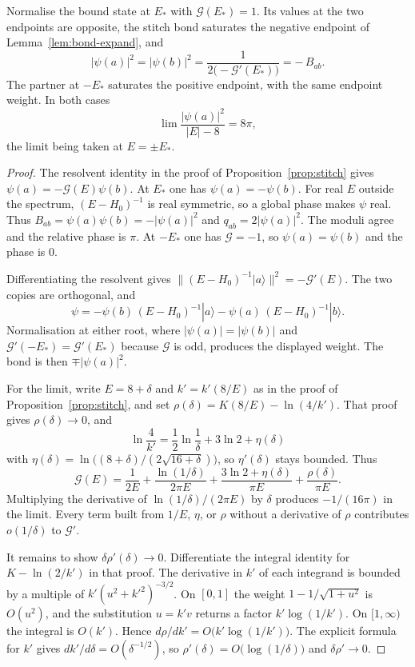 \begin{proposition}
\label{prop:endpoint}
Normalise the bound state at \(E_*\) with \(\mathcal{G}(E_*)=1\).
Its values at the two endpoints are opposite, the stitch bond saturates
the negative endpoint of Lemma~\ref{lem:bond-expand}, and
\[
|\psi(a)|^2=|\psi(b)|^2=\frac{1}{2\bigl(-\mathcal{G}'(E_*)\bigr)}
=-\,B_{ab}.
\]
The partner at \(-E_*\) saturates the positive endpoint, with the same
endpoint weight.
In both cases
\begin{equation}
\label{eq:endwt}
\lim\frac{|\psi(a)|^2}{|E|-8}=8\pi,
\end{equation}
the limit being taken at \(E=\pm E_*\).
\end{proposition}

\begin{proof}
The resolvent identity in the proof of Proposition~\ref{prop:stitch} gives
\(\psi(a)=-\mathcal{G}(E)\psi(b)\).
At \(E_*\) one has \(\psi(a)=-\psi(b)\).
For real \(E\) outside the spectrum, \((E-H_0)^{-1}\) is real symmetric, so a
global phase makes \(\psi\) real.
Thus \(B_{ab}=\psi(a)\psi(b)=-|\psi(a)|^2\) and \(q_{ab}=2|\psi(a)|^2\).
The moduli agree and the relative phase is \(\pi\).
At \(-E_*\) one has \(\mathcal{G}=-1\), so \(\psi(a)=\psi(b)\) and the phase is \(0\).

Differentiating the resolvent gives
\(\|(E-H_0)^{-1}|a\rangle\|^2=-\mathcal{G}'(E)\).
The two copies are orthogonal, and
\[
\psi=-\psi(b)\,(E-H_0)^{-1}|a\rangle-\psi(a)\,(E-H_0)^{-1}|b\rangle.
\]
Normalisation at either root, where \(|\psi(a)|=|\psi(b)|\) and
\(\mathcal{G}'(-E_*)=\mathcal{G}'(E_*)\) because \(\mathcal{G}\) is odd, produces
the displayed weight. The bond is then \(\mp|\psi(a)|^2\).

For the limit, write \(E=8+\delta\) and \(k'=k'(8/E)\) as in the proof of
Proposition~\ref{prop:stitch}, and set
\(\rho(\delta)=K(8/E)-\ln(4/k')\).
That proof gives \(\rho(\delta)\to 0\), and
\[
\ln\frac4{k'}=\frac12\ln\frac1\delta+3\ln 2+\eta(\delta)
\]
with \(\eta(\delta)=\ln\bigl((8+\delta)/(2\sqrt{16+\delta})\bigr)\), so
\(\eta'(\delta)\) stays bounded.
Thus
\[
\mathcal{G}(E)
=\frac{1}{2E}+\frac{\ln(1/\delta)}{2\pi E}+\frac{3\ln 2+\eta(\delta)}{\pi E}
+\frac{\rho(\delta)}{\pi E}.
\]
Multiplying the derivative of \(\ln(1/\delta)/(2\pi E)\) by \(\delta\)
produces \(-1/(16\pi)\) in the limit.
Every term built from \(1/E\), \(\eta\), or \(\rho\) without a derivative
of \(\rho\) contributes \(o(1/\delta)\) to \(\mathcal{G}'\).

It remains to show \(\delta\rho'(\delta)\to 0\).
Differentiate the integral identity for \(K-\ln(2/k')\) in that proof.
The derivative in \(k'\) of each integrand is bounded by a multiple of
\(k'(u^2+k'^2)^{-3/2}\).
On \([0,1]\) the weight \(1-1/\sqrt{1+u^2}\) is \(O(u^2)\), and the
substitution \(u=k'v\) returns a factor \(k'\log(1/k')\).
On \([1,\infty)\) the integral is \(O(k')\).
Hence \(d\rho/dk'=O\bigl(k'\log(1/k')\bigr)\).
The explicit formula for \(k'\) gives \(dk'/d\delta=O(\delta^{-1/2})\), so
\(\rho'(\delta)=O\bigl(\log(1/\delta)\bigr)\) and \(\delta\rho'\to 0\).


\end{proof}
